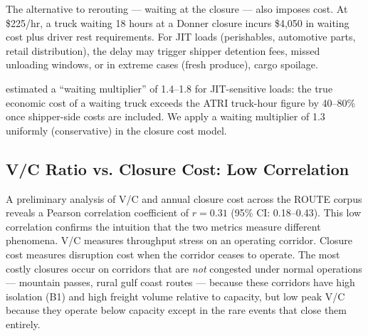 The alternative to rerouting --- waiting at the closure --- also imposes cost. At \$225/hr,
a truck waiting 18 hours at a Donner closure incurs \$4,050 in waiting cost plus driver
rest requirements. For JIT loads (perishables, automotive parts, retail distribution),
the delay may trigger shipper detention fees, missed unloading windows, or in extreme
cases (fresh produce), cargo spoilage.

\citet{Chin2004} estimated a ``waiting multiplier'' of 1.4--1.8 for JIT-sensitive loads:
the true economic cost of a waiting truck exceeds the ATRI truck-hour figure by 40--80\%
once shipper-side costs are included. We apply a waiting multiplier of 1.3 uniformly (conservative) in the closure cost model.

\subsection{V/C Ratio vs. Closure Cost: Low Correlation}

A preliminary analysis of V/C and annual closure cost across the ROUTE corpus reveals
a Pearson correlation coefficient of $r = 0.31$ (95\% CI: 0.18--0.43). This low correlation
confirms the intuition that the two metrics measure different phenomena. V/C measures
throughput stress on an operating corridor. Closure cost measures disruption cost when
the corridor ceases to operate. The most costly closures occur on corridors that are
\textit{not} congested under normal operations --- mountain passes, rural gulf coast
routes --- because these corridors have high isolation (B1) and high freight volume
relative to capacity, but low peak V/C because they operate below capacity except in
the rare events that close them entirely.
